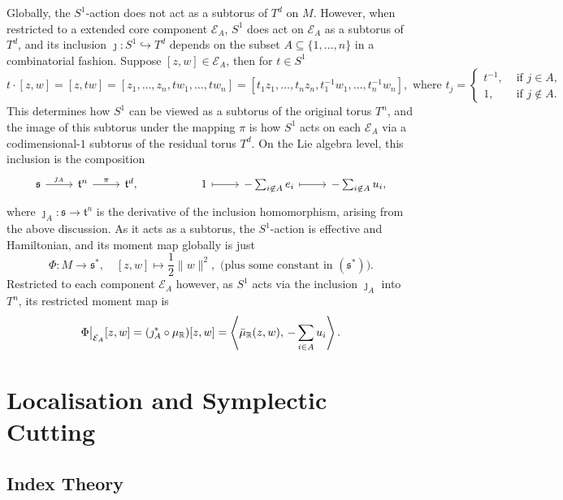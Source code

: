 \documentclass{amsart}
\newcommand{\ra}{\rightarrow}
\newcommand{\RR}{\mathbb{R}}
\newcommand{\mcE}{\mathcal{E}}
\newcommand{\mft}{\mathfrak{t}}
\newcommand{\mf}[1]{\mathfrak{#1}}
\newcommand\restr[2]{{%
		\left.\kern-\nulldelimiterspace %
		#1 %
		\vphantom{\big|} %
		\right|_{#2} %
}}
\begin{document}
	Globally, the $S^{1}$-action does not act as a subtorus of $T^{d}$ on $M$. However, when restricted to a extended core component $\mcE_{A}$, $S^{1}$ does act on $\mcE_{A}$ as a subtorus of $T^{d}$, and its inclusion $\jmath : S^{1} \hookrightarrow T^{d}$ depends on the subset $A \subseteq \{1, \ldots, n\}$ in a combinatorial fashion.
	Suppose $[z, w] \in \mcE_{A}$, then for $t \in S^{1}$
	\[
		t \cdot [z, w] = [z, tw] = [z_{1}, \ldots, z_{n}, tw_{1}, \ldots, tw_{n}] = [t_{1}z_{1}, \ldots, t_{n}z_{n}, t_{1}^{-1}w_{1}, \ldots, t_{n}^{-1}w_{n}], \text{ where } t_{j} =
		\begin{cases}
			t^{-1}, &\text{ if } j \in A, \\
			1, &\text{ if } j \not\in A.
		\end{cases}
	\]
	This determines how $S^{1}$ can be viewed as a subtorus of the original torus $T^{n}$, and the image of this subtorus under the mapping $\pi$ is how $S^{1}$ acts on each $\mcE_{A}$ via a codimensional-$1$ subtorus of the residual torus $T^{d}$. On the Lie algebra level, this inclusion is the composition
	\[
	\begin{tikzcd}[ampersand replacement=\&]
		\mf{s} \arrow[r, "\jmath_{A}"] \&
		\mft^{n} \arrow[r, "\pi"] \& \mft^{d}, \& \& 1 \arrow[r, mapsto] \& -\sum_{i \not\in A}e_{i} \arrow[r, mapsto] \& -\sum_{i \not\in A} u_{i},
	\end{tikzcd}
	\]
	where $\jmath_{A} : \mf{s} \ra \mft^{n}$ is the derivative of the inclusion homomorphism, arising from the above discussion. As it acts as a subtorus, the $S^{1}$-action is effective and Hamiltonian, and its moment map globally is just
	\[
		\Phi : M \ra \mf{s}^{\ast}, \quad [z,w] \mapsto \frac{1}{2}\|w\|^{2}, \text{ (plus some constant in } (\mf{s}^{\ast})\text{)}.
	\]
	Restricted to each component $\mcE_{A}$ however, as $S^{1}$ acts via the inclusion $\jmath_{A}$ into $T^{n}$, its restricted moment map is
	\[
		\restr{\Phi}{\mcE_{A}}[z,w] = (\jmath_{A}^{\ast} \circ \mu_{\RR})[z,w] = \left\langle \bar{\mu}_{\RR}(z,w), \, -\sum_{i \in A} u_{i} \right\rangle.
	\]
	
	
	\section{Localisation and Symplectic Cutting}
	
	\subsection{Index Theory}
	
\end{document}
